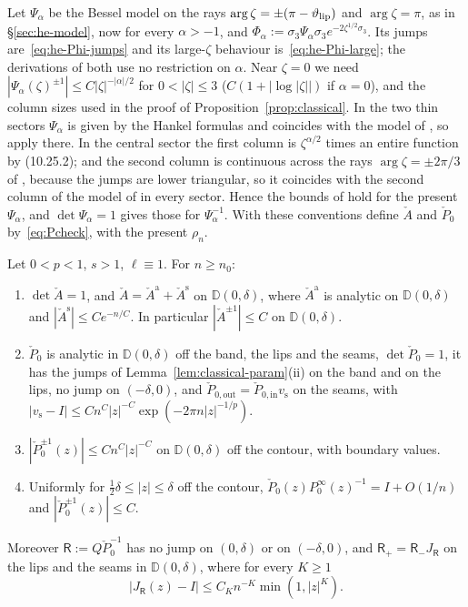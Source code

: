 Let $\Psi_\alpha$ be the Bessel model on the rays $\arg\zeta=\pm(\pi-\vartheta_{\mathrm{lip}})$ and $\arg\zeta=\pi$, as in
\S\ref{sec:he-model}, now for every $\alpha>-1$, and $\Phi_\alpha:=\sigma_3\Psi_\alpha\sigma_3e^{-2\zeta^{1/2}\sigma_3}$. Its
jumps are~\eqref{eq:he-Phi-jumps} and its large-$\zeta$ behaviour is~\eqref{eq:he-Phi-large}; the derivations of both use
no restriction on $\alpha$. Near $\zeta=0$ we need $|\Psi_\alpha(\zeta)^{\pm1}|\le C|\zeta|^{-|\alpha|/2}$ for
$0<|\zeta|\le3$ ($C(1+|\log|\zeta||)$ if $\alpha=0$), and the column sizes used in the proof of
Proposition~\ref{prop:classical}. In the two thin sectors $\Psi_\alpha$ is given by the Hankel formulas
\cite[(6.24)--(6.25)]{KMVV} and coincides with the model of \cite[\S6]{KMVV}, so \cite[(6.19)--(6.21)]{KMVV} apply there.
In the central sector the first column is $\zeta^{\alpha/2}$ times an entire function by (10.25.2); and the second column
is continuous across the rays $\arg\zeta=\pm2\pi/3$ of \cite[\S6]{KMVV}, because the jumps
\cite[(6.16), (6.18)]{KMVV} are lower triangular, so it coincides with the second column of the model of
\cite[\S6]{KMVV} in every sector. Hence the bounds of \cite[(6.19)--(6.21)]{KMVV} hold for the present $\Psi_\alpha$,
and $\det\Psi_\alpha=1$ gives those for $\Psi_\alpha^{-1}$. With these conventions define $\check A$ and $\check P_0$
by~\eqref{eq:Pcheck}, with the present $\rho_n$.

\begin{lemma}\label{lem:plt1-param}
Let $0<p<1$, $s>1$, $\ell\equiv1$. For $n\ge n_0$:
\begin{enumerate}
\item[(i)] $\det\check A=1$, and $\check A=\check A^{\mathrm a}+\check A^{\mathrm s}$ on $\mathbb D(0,\delta)$, where
  $\check A^{\mathrm a}$ is analytic on $\mathbb D(0,\delta)$ and $|\check A^{\mathrm s}|\le Ce^{-n/C}$. In particular
  $|\check A^{\pm1}|\le C$ on $\mathbb D(0,\delta)$.
\item[(ii)] $\check P_0$ is analytic in $\mathbb D(0,\delta)$ off the band, the lips and the seams, $\det\check P_0=1$, it
  has the jumps of Lemma~\ref{lem:classical-param}(ii) on the band and on the lips, no jump on $(-\delta,0)$, and
  $\check P_{0,\mathrm{out}}=\check P_{0,\mathrm{in}}v_{\mathrm s}$ on the seams, with
  $|v_{\mathrm s}-I|\le Cn^C|z|^{-C}\exp(-2\pi n|z|^{-1/p})$.
\item[(iii)] $|\check P_0^{\pm1}(z)|\le Cn^C|z|^{-C}$ on $\mathbb D(0,\delta)$ off the contour, with boundary values.
\item[(iv)] Uniformly for $\frac12\delta\le|z|\le\delta$ off the contour, $\check P_0(z)P^\infty_0(z)^{-1}=I+O(1/n)$ and
  $|\check P_0^{\pm1}(z)|\le C$.
\end{enumerate}
Moreover $\mathsf R:=Q\check P_0^{-1}$ has no jump on $(0,\delta)$ or on $(-\delta,0)$, and $\mathsf R_+=\mathsf R_-J_{\mathsf R}$
on the lips and the seams in $\mathbb D(0,\delta)$, where for every $K\ge1$
\[
  |J_{\mathsf R}(z)-I|\le C_Kn^{-K}\min(1,|z|^K).
\]
\end{lemma}

